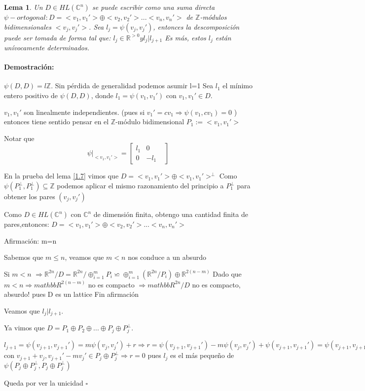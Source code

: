 \documentclass[12pt]{article}
\newtheorem{lemma}{Lema}
\newenvironment{proof}{\paragraph{Demostración:}}{\hfill$\square$}
\begin{document}
\begin{lemma} \label{1.8}
 Un $D \in HL(\mathbb{C}^n)$ se puede escribir como una suma directa $\psi-ortogonal : D=<v_1,v_1'>\oplus<v_2,v_2'>...<v_n,v_n'>$
 de $\mathbb{Z}$-módulos bidimensionales $<v_j,v_j'>$. Sea $l_j=\psi(v_j,v_j')$, entonces la descomposición puede ser tomada 
 de forma tal que: $l_j \in \mathbb{R}^{>0} y l_j | l_{j+1}$
 Es más, estos $l_j$ están unívocamente determinados.
\end{lemma}

\begin{proof}
$\psi(D,D)  = l \mathbb{Z}$. Sin pérdida de generalidad podemos asumir l=1
Sea $l_1$ el mínimo entero positivo de $\psi(D,D)$, donde $l_1=\psi(v_1,v_1')$ con $v_1,v_1' \in D$. 

$v_1,v_1'$ son linealmente independientes. (pues si $v_1'=c v_1 \Rightarrow \psi(v_1,c v_1)=0$ ) entonces tiene sentido
pensar en el $\mathbb{Z}$-módulo bidimensional $P_1:=<v_1,v_1'>$

Notar que $$
\psi|_{<v_1,v_1'>} = \begin{bmatrix}
                              l_1 & 0 &\\
                              0 & -l_1 &
                             \end{bmatrix}
$$

En la prueba del lema \ref{1.7} vimos que $D=<v_1,v_1'> \oplus <v_1,v_1'>^\bot$
Como $\psi(P_1^\bot,P_1^\bot) \subseteq \mathbb{Z}$ podemos aplicar el mismo razonamiento del principio a $P_1^\bot$ 
para obtener los pares $(v_j,v_j')$

Como $D \in HL(\mathbb{C}^n)$ con $\mathbb{C}^n$ de dimensión finita,  obtengo una cantidad finita de pares,entonces:
$D=<v_1,v_1'>\oplus<v_2,v_2'>...<v_n,v_n'>$

Afirmación: m=n

Sabemos que $m\leq n$, veamos que $m<n$ nos conduce a un absurdo

Si $m<n$ $\Rightarrow \mathbb{R}^{2n}/D=\mathbb{R}^{2n}/\oplus_{i=1}^m P_i \backsimeq \oplus_{i=1}^m (\mathbb{R}^{2n}/P_i) \oplus \mathbb{R}^{2(n-m)} $\newline
Dado que $m<n \Rightarrow  mathbb{R}^{2(n-m)}$ no es compacto $\Rightarrow mathbb{R}^{2n}/D$ no es compacto, absurdo! pues D es un lattice
Fin afirmación

Veamos que $l_j|l_{j+1}$.

Ya vimos que $D= P_1\oplus P_2 \oplus...\oplus P_j \oplus P_j^\bot$.

$l_{j+1}=\psi(v_{j+1},v_{j+1}')=m \psi(v_j,v_j') +r \Rightarrow r=\psi(v_{j+1},v_{j+1}')-m \psi(v_j,v_j') + \psi(v_{j+1},v_{j+1}')
=\psi(v_{j+1},v_{j+1}')-m \psi(v_j,v_j') + \psi(v_{j+1},v_{j+1}') + \psi(v_{j+1},-mv_j') + \psi(v_j,v_{j+1}')
=\psi(v_{j+1} + v_j, v_{j+1}'-m v_j')$ con $v_{j+1} + v_j, v_{j+1}'-m v_j' \in P_j \oplus P_j^\bot \Rightarrow
r=0$ pues $l_j$ es el más pequeño de $\psi(P_j \oplus P_j^\bot, P_j \oplus P_j^\bot)$


{\color{red} Queda por ver la unicidad}
 \end{proof}
 
\end{document}
